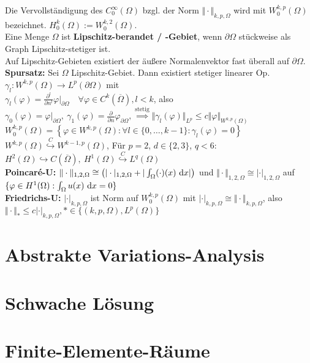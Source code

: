 \documentclass[12pt]{scrartcl}
\begin{document}
	Die Vervollständigung des $C_0^\infty(\Omega)$ bzgl. der Norm $\Vert\cdot\Vert_{k,p,\Omega}$ wird mit $W_0^{k,p}(\Omega)$ bezeichnet.
	$H_0^k(\Omega):=W_0^{k,2}(\Omega)$.\\
	Eine Menge $\Omega$ ist \textbf{Lipschitz-berandet / -Gebiet}, wenn $\partial\Omega$ stückweise als Graph Lipschitz-stetiger ist.\\
	Auf Lipschitz-Gebieten existiert der äußere Normalenvektor fast überall auf $\partial\Omega$.\\
	\textbf{Spursatz:} Sei $\Omega$ Lipschitz-Gebiet. Dann existiert stetiger linearer Op. $\gamma_l:W^{k,p}(\Omega)\rightarrow L^p(\partial\Omega)$ mit\\ 
	$\gamma_l(\varphi)=\frac{\partial^l}{\partial n^l}\varphi|_{\partial\Omega}\quad\forall\varphi\in C^k(\overline{\Omega}),l<k$, also $\gamma_0(\varphi)=\varphi|_{\partial\Omega},~\gamma_1(\varphi)=\frac{\partial}{\partial n}\varphi_{\partial\Omega},\overset{\text{stetig}}{\implies}
	\Vert\gamma_l(\varphi)\Vert_{L^p}\leq c\Vert\varphi\Vert_{W^{k,p}(\Omega)}$\\
	$W_0^{k,p}(\Omega)=\left\lbrace\varphi\in W^{k,p}(\Omega):
		\forall l\in\lbrace0,\ldots,k-1\rbrace:\gamma_l(\varphi)=0\right\rbrace$\\
	$W^{k,p}(\Omega)\stackrel{C}{\hookrightarrow} W^{k-1,p}(\Omega)$, 
	Für $p=2$, $d\in\lbrace2,3\rbrace$, $q<6$:
	$H^2(\Omega)\hookrightarrow C(\overline{\Omega}),~H^1(\Omega)\stackrel{C}{\hookrightarrow} L^q(\Omega)$\\
	\textbf{Poincaré-U:} $\Vert\cdot\Vert_{1,2,\Omega}\cong\big(|\cdot|_{1,2,\Omega}+|\int_\Omega(\cdot)(x)\text{ d} x|\big)$ und $\Vert\cdot\Vert_{1,2,\Omega}\cong|\cdot|_{1,2,\Omega}$ auf $\lbrace\varphi\in H^1(\Omega):\int_\Omega u(x)\text{ d} x=0\rbrace$\\
	\textbf{Friedrichs-U:} $|\cdot|_{k,p,\Omega}$ ist Norm auf $W_0^{k,p}(\Omega)$ mit $|\cdot|_{k,p,\Omega}\cong\Vert\cdot\Vert_{k,p,\Omega}$, also $\Vert\cdot\Vert_\ast\leq c|\cdot|_{k,p,\Omega},*\in\lbrace(k,p,\Omega),L^p(\Omega)\rbrace$
	
	\section{Abstrakte Variations-Analysis}
	
	\section{Schwache Lösung}
	
	\section{Finite-Elemente-Räume}
	
\end{document}

